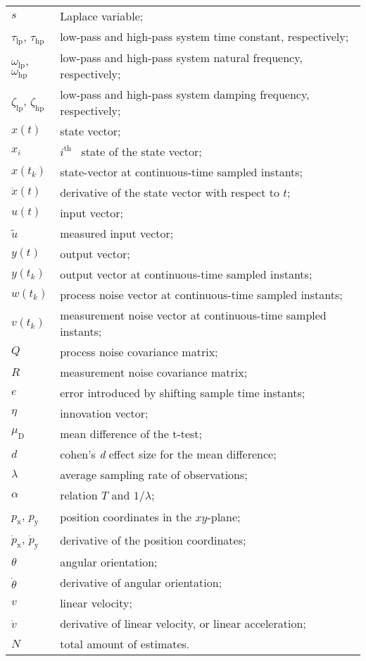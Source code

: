 \begin{longtable}{ll}
	$s$						& Laplace variable; \\
	$\tau_{\textrm{lp}}$,
	$\tau_{\textrm{hp}}$	& low-pass and high-pass system time constant, respectively; \\
	$\omega_{\textrm{lp}}$,
	$\omega_{\textrm{hp}}$	& low-pass and high-pass system natural frequency, respectively; \\
	$\zeta_{\textrm{lp}}$,
	$\zeta_{\textrm{hp}}$	& low-pass and high-pass system damping frequency, respectively; \\
	$x(t)$					& state vector; \\
	$x_i$					& $i^{\textrm{th}}$ \ state of the state vector; \\
	$x(t_k)$				& state-vector at continuous-time sampled instants; \\
	$\dot{x}(t)$			& derivative of the state vector with respect to $t$; \\
	$u(t)$					& input vector; \\
	$\tilde{u}$				& measured input vector; \\
	$y(t)$					& output vector; \\
	$y(t_k)$				& output vector at continuous-time sampled instants;\\

	$w(t_k)$				& process noise vector at continuous-time sampled instants; \\
	$v(t_k)$				& measurement noise vector at continuous-time sampled instants; \\
	$Q$						& process noise covariance matrix; \\
	$R$						& measurement noise covariance matrix; \\
	$e$						& error introduced by shifting sample time instants; \\
	$\eta$					& innovation vector; \\
	$\mu_{\textrm{D}}$		& mean difference of the t-test; \\
	$d$						& cohen's \textit{d} effect size for the mean difference; \\
	
	$\lambda$				& average sampling rate of observations; \\
	$\alpha$				& relation $T$ and $1/ \lambda$; \\
	
	$p_\textrm{x}$,
	$p_\textrm{y}$			& position coordinates in the $xy$-plane; \\
	$\dot{p}_\textrm{x}$,
	$\dot{p}_\textrm{y}$ 	& derivative of the position coordinates; \\
	$\theta$				& angular orientation; \\
	$\dot{\theta}$			& derivative of angular orientation; \\
	$v$						& linear velocity; \\
	$\dot{v}$				& derivative of linear velocity, or linear acceleration; \\
	$N$						& total amount of estimates. \\

\end{longtable}


